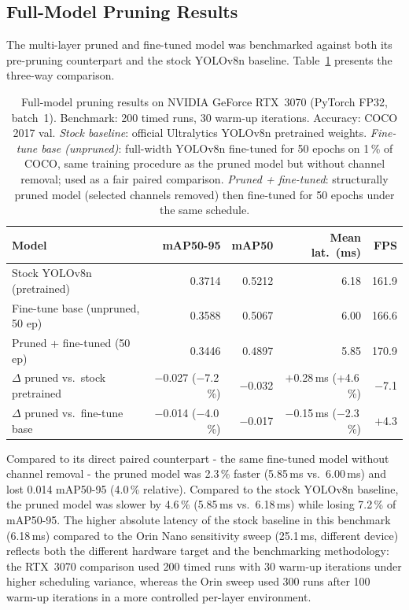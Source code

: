 \documentclass[12pt,a4paper]{report}
\begin{document}
\subsection{Full-Model Pruning Results}

The multi-layer pruned and fine-tuned model was benchmarked against both its pre-pruning
counterpart and the stock YOLOv8n baseline.
Table~\ref{tab:pruning_final_results} presents the three-way comparison.

\begin{table}[ht]
\centering
\caption{Full-model pruning results on NVIDIA GeForce RTX~3070 (PyTorch FP32, batch~1).
Benchmark: 200 timed runs, 30 warm-up iterations. Accuracy: COCO 2017 val.
\emph{Stock baseline}: official Ultralytics YOLOv8n pretrained weights.
\emph{Fine-tune base (unpruned)}: full-width YOLOv8n fine-tuned for 50 epochs on 1\,\% of
COCO, same training procedure as the pruned model but without channel removal; used as a
fair paired comparison.
\emph{Pruned + fine-tuned}: structurally pruned model (selected channels removed) then
fine-tuned for 50 epochs under the same schedule.}
\label{tab:pruning_final_results}
\begin{tabular}{lrrrr}
\toprule
Model & mAP50-95 & mAP50 & Mean lat.\ (ms) & FPS \\
\midrule
Stock YOLOv8n (pretrained)       & 0.3714 & 0.5212 & 6.18 & 161.9 \\
Fine-tune base (unpruned, 50 ep) & 0.3588 & 0.5067 & 6.00 & 166.6 \\
Pruned + fine-tuned (50 ep)      & 0.3446 & 0.4897 & 5.85 & 170.9 \\
\midrule
$\Delta$ pruned vs.\ stock pretrained   & $-$0.027 ($-$7.2\,\%) & $-$0.032 & $+$0.28\,ms (+4.6\,\%) & $-$7.1 \\
$\Delta$ pruned vs.\ fine-tune base     & $-$0.014 ($-$4.0\,\%) & $-$0.017 & $-$0.15\,ms ($-$2.3\,\%) & $+$4.3 \\
\bottomrule
\end{tabular}
\end{table}

Compared to its direct paired counterpart - the same fine-tuned model without channel
removal - the pruned model was 2.3\,\% faster (5.85\,ms vs.\ 6.00\,ms) and lost 0.014
mAP50-95 (4.0\,\%
relative). Compared to the stock YOLOv8n baseline, the pruned model was
slower by 4.6\,\% (5.85\,ms vs.\ 6.18\,ms) while losing 7.2\,\% of mAP50-95.
The higher absolute latency of the stock baseline in this benchmark (6.18\,ms) compared to
the Orin Nano sensitivity sweep (25.1\,ms, different device) reflects both the different
hardware target and the benchmarking methodology: the RTX~3070 comparison used 200 timed
runs with 30 warm-up iterations under higher scheduling variance, whereas the Orin sweep
used 300 runs after 100 warm-up iterations in a more controlled per-layer environment.
\end{document}
